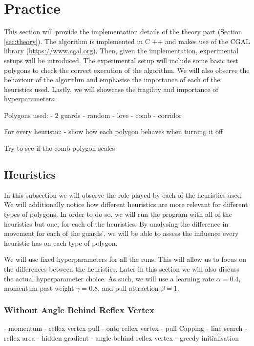 \section{Practice}
\label{sec:experiments}

This section will provide the implementation details of the theory part (Section \ref{sec:theory}). The algorithm is implemented in C ++ and makes use of the CGAL library (\url{https://www.cgal.org}). 
Then, given the implementation, experimental setups will be introduced. The experimental setup will include some basic test polygons to check the correct execution of the algorithm. We will also observe the behaviour of the algorithm and emphasise the importance of each of the heuristics used. Lastly, we will showcase the fragility and importance of hyperparameters.

Polygons used:
- 2 guards
- random
- love
- comb
- corridor

For every heuristic:
- show how each polygon behaves when turning it off

Try to see if the comb polygon scales

\subsection{Heuristics}
In this subsection we will observe the role played by each of the heuristics used. We will additionally notice how different heuristics are more relevant for different types of polygons. In order to do so, we will run the program with all of the heuristics but one, for each of the heuristics. By analysing the difference in movement for each of the guards', we will be able to assess the influence every heuristic has on each type of polygon.

We will use fixed hyperparameters for all the runs. This will allow us to focus on the differences between the heuristics. Later in this section we will also discuss the actual hyperparameter choice. As such, we will use a learning rate $\alpha = 0.4$, momentum past weight $\gamma = 0.8$, and pull attraction $\beta = 1$.

\subsubsection{Without Angle Behind Reflex Vertex}

- momentum
- reflex vertex pull
    - onto reflex vertex
    - pull Capping
- line search
- reflex area
- hidden gradient
- angle behind reflex vertex
- greedy initialisation